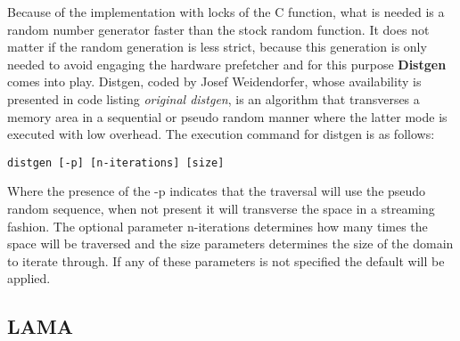 Because of the implementation with locks of the C function, what is needed is a random number generator faster than the stock random function. It does not matter if the random generation is less strict, because this generation is only needed to avoid engaging the hardware prefetcher and for this purpose \textbf{Distgen} comes into play. Distgen, coded by Josef Weidendorfer, whose availability is presented in code listing \textit{original distgen}, is an algorithm that transverses a memory area in a sequential or pseudo random manner where the latter mode is executed with low overhead. The execution command for distgen is as follows:
\begin{center}
\texttt{distgen [-p] [n-iterations] [size]}
\end{center}

Where the presence of the -p indicates that the traversal will use the pseudo random sequence, when not present it will transverse the space in a streaming fashion. The optional parameter n-iterations determines how many times the space will be traversed and the size parameters determines the size of the domain to iterate through. If any of these parameters is not specified the default will be applied.

\subsection{LAMA}\label{section:Lama}
